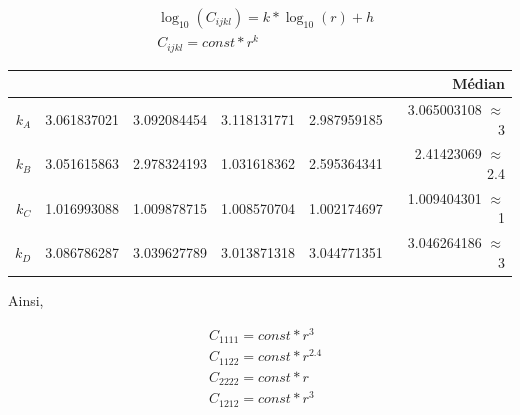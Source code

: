 \documentclass{article}
\begin{document}
\begin{align*}
    & \log_{10}(C_{ijkl}) = k * \log_{10}(r) + h \\
    & C_{ijkl} = const * r^k
\end{align*}

\begin{table}[H]
    \begin{tabular}{|r|r|r|r|r|r|}
        \hline
         & & & & & Médian \\ \hline
        $k_A$                       & 3.061837021 & 3.092084454 & 3.118131771   & 2.987959185 & 3.065003108 $\approx$ 3 \\ \hline
        $k_B$                      & 3.051615863 & 2.978324193 & 1.031618362   & 2.595364341 & 2.41423069 $\approx$ 2.4\\ \hline
        $k_C$                       & 1.016993088 & 1.009878715 & 1.008570704   & 1.002174697 & 1.009404301 $\approx$ 1\\ \hline
        $k_D$                      & 3.086786287 & 3.039627789 & 3.013871318   & 3.044771351 & 3.046264186 $\approx$ 3\\ \hline
    \end{tabular}
\end{table}
Ainsi,

\begin{align}
\label{eqn:Cijkl_num}
    & C_{1111} = const * r^3 \\
    & C_{1122} = const * r^{2.4} \\
    & C_{2222} = const * r \\
    & C_{1212} = const * r^3 
\end{align}
\end{document}
